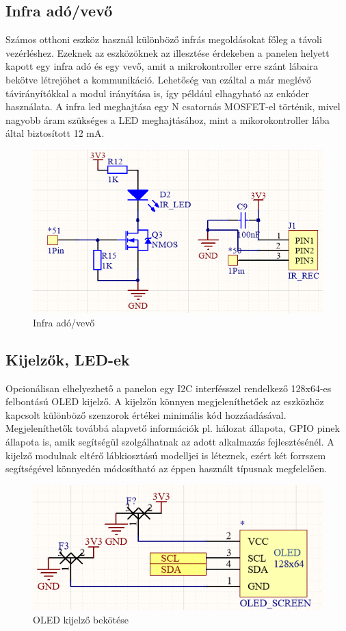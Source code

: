 \subsection{Infra adó/vevő}
Számos otthoni eszköz használ különböző infrás megoldásokat főleg a távoli vezérléshez. Ezeknek az eszközöknek az illesztése érdekeben a panelen helyett kapott egy infra adó és egy vevő, amit a mikrokontroller erre szánt lábaira bekötve létrejöhet a kommunikáció. Lehetőség van ezáltal a már meglévő távirányítókkal a modul irányítása is, így például elhagyható az enkóder használata.
A infra led meghajtása egy N csatornás MOSFET-el történik, mivel nagyobb áram szükséges a LED meghajtásához, mint a mikorokontroller lába által biztosított 12 mA.
\begin{figure}[!ht]
    \centering
    \includegraphics[width=130mm, keepaspectratio]{figures/infra.png}
    \caption{Infra adó/vevő}
    \label{fig:ir_ado_vevo}
\end{figure}


\subsection{Kijelzők, LED-ek}
Opcionálisan elhelyezhető a panelon egy I2C interfésszel rendelkező 128x64-es felbontású OLED kijelző. A kijelzőn könnyen megjeleníthetőek az eszközhöz kapcsolt különböző szenzorok értékei minimális kód hozzáadásával. Megjeleníthetők továbbá alapvető információk pl. hálozat állapota, GPIO pinek állapota is, amik segítségül szolgálhatnak az adott alkalmazás fejlesztésénél. A kijelző modulnak eltérő lábkiosztású modelljei is léteznek, ezért két forrszem segítségével könnyedén módosítható az éppen használt típusnak megfelelően.
\begin{figure}[!ht]
    \centering
    \includegraphics[width=120mm, keepaspectratio]{figures/display.png}
    \caption{OLED kijelző bekötése}
    \label{fig:oled}
\end{figure}

